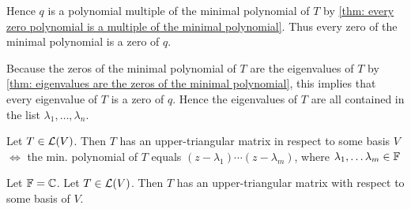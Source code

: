\begin{prf}
  Hence $q$ is a polynomial multiple of the minimal polynomial of $T$ by \ref{thm: every zero polynomial is a multiple of the minimal polynomial}. Thus every zero of the minimal polynomial is a zero of $q$.
  
  Because the zeros of the minimal polynomial of $T$ are the eigenvalues of $T$ by \ref{thm: eigenvalues are the zeros of the minimal polynomial}, this implies that every eigenvalue of $T$ is a zero of $q$. Hence the eigenvalues of $T$ are all contained in the list $\lambda_1, \ldots, \lambda_n$.
\end{prf}


\setcounter{thm}{43}
\begin{thm}
  \label{thm:necessary and sufficient condition to have an upper-triangular-matrix}
  Let $T\in \mathcal{L}(V)$\footnotemark[1]. Then $T$ has an upper-triangular matrix in respect to some basis $V$ $\iff$ the min. polynomial of $T$ equals $(z-\lambda_1) \cdots (z-\lambda_m)$, where $\lambda_1, \dots \lambda_m \in \mathbb{F}$
\end{thm}

\setcounter{thm}{46}
\begin{thm}
  \label{thm: necessary condition for every operator to have an upper-triangular matrix}
  Let $\mathbb{F} = \mathbb{C}$. Let $T\in \mathcal{L} (V)$\footnotemark[1]. Then $T$ has an upper-triangular matrix with respect to some basis of $V$.
\end{thm}

\setcounter{footnote}{1}
